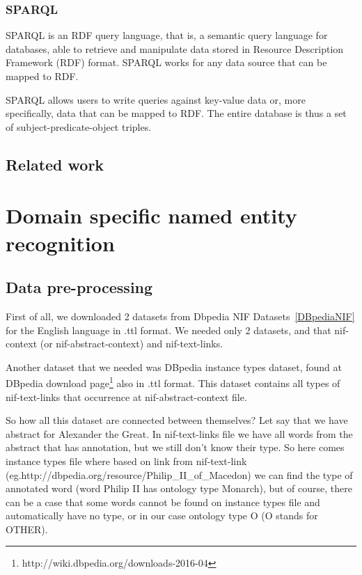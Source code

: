 \documentclass[thesis=M,english]{FITthesis}[2018/05/30]
\begin{document}
\subsection{SPARQL}\label{SPARQL}
SPARQL \cite{master:SPARQL} is an RDF query language, that is, a semantic query language for databases, able to retrieve and manipulate data stored in Resource Description Framework (RDF) format. SPARQL works for any data source that can be mapped to RDF.

SPARQL allows users to write queries against key-value data or, more specifically, data that can be mapped to RDF. The entire database is thus a set of subject-predicate-object triples.


\section{Related work}

\chapter{Domain specific named entity recognition}\label{}

\section{Data pre-processing}\label{dataPreProcessing}
	First of all, we downloaded 2 datasets from Dbpedia NIF Datasets~\ref{DBpediaNIF} for the English language in .ttl format. We needed only 2 datasets, and that nif-context (or nif-abstract-context) and nif-text-links.

	Another dataset that we needed was DBpedia instance types dataset, found at DBpedia download page\footnote{http://wiki.dbpedia.org/downloads-2016-04} also in .ttl format. This dataset contains all types of nif-text-links that occurrence at nif-abstract-context file.

	So how all this dataset are connected between themselves? Let say that we have abstract for Alexander the Great. In nif-text-links file we have all words from the abstract that has annotation, but we still don't know their type. So here comes instance types file where based on link from nif-text-link (eg.http://dbpedia.org/resource/Philip\_II\_of\_Macedon) we can find the type of annotated word (word Philip II has ontology type Monarch), but of course, there can be a case that some words cannot be found on instance types file and automatically have no type, or in our case ontology type O (O stands for OTHER).
\end{document}
